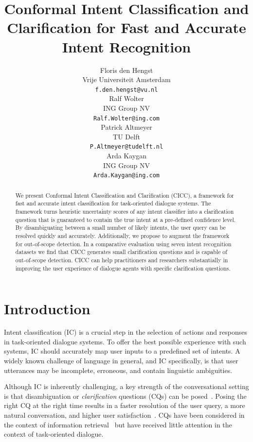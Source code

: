 \documentclass[11pt]{article}
\title{Conformal Intent Classification and Clarification for Fast and Accurate Intent Recognition}
\author{Floris den Hengst \\
  Vrije Universiteit Amsterdam \\
  \texttt{f.den.hengst@vu.nl} \\\And
  Ralf Wolter \\
  ING Group NV \\
  \texttt{Ralf.Wolter@ing.com} 
  \\\AND
  Patrick Altmeyer \\
  TU Delft \\
  \texttt{P.Altmeyer@tudelft.nl} 
  \\\And  
  Arda Kaygan \\
  ING Group NV \\
  \texttt{Arda.Kaygan@ing.com}
  }
\begin{document}
\maketitle
\begin{abstract}
We present Conformal Intent Classification and Clarification (CICC), a framework for fast and accurate intent classification for task-oriented dialogue systems. The framework turns heuristic uncertainty scores of any intent classifier into a clarification question that is guaranteed to contain the true intent at a pre-defined confidence level.
By disambiguating between a small number of likely intents, the user query can be resolved quickly and accurately. Additionally, we propose to augment the framework for out-of-scope detection.
In a comparative evaluation using seven intent recognition datasets we find that CICC generates small clarification questions and is capable of out-of-scope detection.
CICC can help practitioners and researchers substantially in improving the user experience of dialogue agents with specific clarification questions.
\end{abstract}

\section{Introduction}
Intent classification (IC) is a crucial step in the selection of actions and responses in task-oriented dialogue systems. To offer the best possible experience with such systems, IC should accurately map user inputs to a predefined set of intents. A widely known challenge of language in general, and IC specifically, is that user utterances may be incomplete, erroneous, and contain linguistic ambiguities.

Although IC is inherently challenging, a key strength of the conversational setting is that disambiguation or \emph{clarification} questions (CQs) can be posed~\citep{purver2003means,alfieri2022intent}. Posing the right CQ at the right time results in a faster resolution of the user query, a more natural conversation, and higher user satisfaction~\citep{van2020collecting,keyvan2022approach,siro2022understanding}. CQs have been considered in the context of information retrieval~\cite{zamani2020generating} but have received little attention in the context of task-oriented dialogue. 
\end{document}
